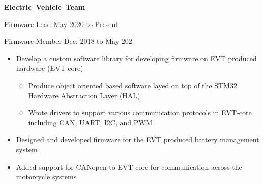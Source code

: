 \documentclass{article}
\newcommand{\rSubSubSection}[1] {
  \textbf{{\fontsize{0.35cm}{0.45cm}\selectfont \hbox{#1}}}
}
\begin{document}
\rSubSubSection{Electric Vehicle Team}\par
Firmware Lead \hfill May 2020 to Present \par
Firmware Member \hfill Dec. 2018 to May 202
\vspace{-10pt}
\begin{itemize}
    \setlength\itemsep{0pt}
    \setlength{\parskip}{0pt}
    \item Develop a custom software library for developing firmware on EVT produced hardware (EVT-core)
    \begin{itemize}
        \setlength\itemsep{0pt}
        \setlength{\parskip}{0pt}
        \item Produce object oriented based software layed on top of the STM32 Hardware Abstraction Layer (HAL)
        \item Wrote drivers to support various communication protocols in EVT-core including CAN, UART, I2C, and PWM
    \end{itemize}
    \item Designed and developed firmware for the EVT produced battery management system
    \item Added support for CANopen to EVT-core for communication across the motorcycle systems
\end{itemize}
\vspace{-10pt}
\end{document}

